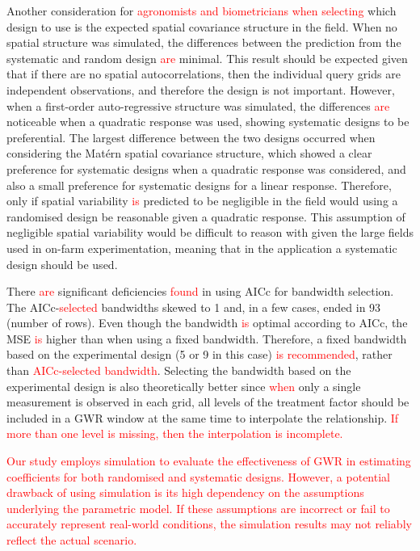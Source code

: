\documentclass[a4paper]{article} 	%
\newcommand{\Matern}{Mat\'ern }
\newcommand{\zc}[1]{\textcolor{red}{#1}}
\begin{document}
Another consideration for \zc{agronomists and biometricians when selecting} which design to use is the expected spatial covariance structure in the field. When no spatial structure was simulated, the differences between the prediction from the systematic and random design \zc{are} minimal. This result should be expected given that if there are no spatial autocorrelations, then the individual query grids are independent observations, and therefore the design is not important. However, when a first-order auto-regressive structure was simulated, the differences \zc{are} noticeable when a quadratic response was used, showing systematic designs to be preferential. The largest difference between the two designs occurred when considering the \Matern spatial covariance structure, which showed a clear preference for systematic designs when a quadratic response was considered, and also a small preference for systematic designs for a linear response. Therefore, only if spatial variability \zc{is} predicted to be negligible in the field would using a randomised design be reasonable given a quadratic response. This assumption of negligible spatial variability would be difficult to reason with given the large fields used in on-farm experimentation, meaning that in the application a systematic design should be used. 


There \zc{are} significant deficiencies \zc{found} in using AICc for bandwidth selection. The AICc-\zc{selected} bandwidths skewed to 1 and, in a few cases, ended in 93 (number of rows). Even though the bandwidth \zc{is} optimal according to AICc, the MSE \zc{is} higher than when using a fixed bandwidth. Therefore, a fixed bandwidth based on the experimental design (5 or 9 in this case) \zc{is recommended}, rather than \zc{AICc-selected bandwidth}. Selecting the bandwidth based on the experimental design is also theoretically better since \zc{when} only a single measurement is observed in each grid, all levels of the treatment factor should be included in a GWR window at the same time to interpolate the relationship. \zc{If more than one level is missing, then the interpolation is incomplete.} 


\zc{Our study employs simulation to evaluate the effectiveness of GWR in estimating coefficients for both randomised and systematic designs. However, a potential drawback of using simulation is its high dependency on the assumptions underlying the parametric model. If these assumptions are incorrect or fail to accurately represent real-world conditions, the simulation results may not reliably reflect the actual scenario.}
\end{document}
